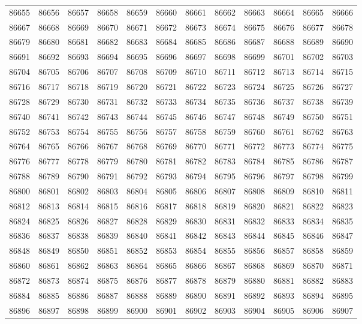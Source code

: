 \begin{center}
\begin{longtable}{llllllllllll}
86655 &86656 &86657 &86658 &86659 &86660 &86661 &86662 &86663 &86664 &86665 &86666 \\
86667 &86668 &86669 &86670 &86671 &86672 &86673 &86674 &86675 &86676 &86677 &86678 \\
86679 &86680 &86681 &86682 &86683 &86684 &86685 &86686 &86687 &86688 &86689 &86690 \\
86691 &86692 &86693 &86694 &86695 &86696 &86697 &86698 &86699 &86701 &86702 &86703 \\
86704 &86705 &86706 &86707 &86708 &86709 &86710 &86711 &86712 &86713 &86714 &86715 \\
86716 &86717 &86718 &86719 &86720 &86721 &86722 &86723 &86724 &86725 &86726 &86727 \\
86728 &86729 &86730 &86731 &86732 &86733 &86734 &86735 &86736 &86737 &86738 &86739 \\
86740 &86741 &86742 &86743 &86744 &86745 &86746 &86747 &86748 &86749 &86750 &86751 \\
86752 &86753 &86754 &86755 &86756 &86757 &86758 &86759 &86760 &86761 &86762 &86763 \\
86764 &86765 &86766 &86767 &86768 &86769 &86770 &86771 &86772 &86773 &86774 &86775 \\
86776 &86777 &86778 &86779 &86780 &86781 &86782 &86783 &86784 &86785 &86786 &86787 \\
86788 &86789 &86790 &86791 &86792 &86793 &86794 &86795 &86796 &86797 &86798 &86799 \\
86800 &86801 &86802 &86803 &86804 &86805 &86806 &86807 &86808 &86809 &86810 &86811 \\
86812 &86813 &86814 &86815 &86816 &86817 &86818 &86819 &86820 &86821 &86822 &86823 \\
86824 &86825 &86826 &86827 &86828 &86829 &86830 &86831 &86832 &86833 &86834 &86835 \\
86836 &86837 &86838 &86839 &86840 &86841 &86842 &86843 &86844 &86845 &86846 &86847 \\
86848 &86849 &86850 &86851 &86852 &86853 &86854 &86855 &86856 &86857 &86858 &86859 \\
86860 &86861 &86862 &86863 &86864 &86865 &86866 &86867 &86868 &86869 &86870 &86871 \\
86872 &86873 &86874 &86875 &86876 &86877 &86878 &86879 &86880 &86881 &86882 &86883 \\
86884 &86885 &86886 &86887 &86888 &86889 &86890 &86891 &86892 &86893 &86894 &86895 \\
86896 &86897 &86898 &86899 &86900 &86901 &86902 &86903 &86904 &86905 &86906 &86907 \\

\end{longtable}
\end{center}

